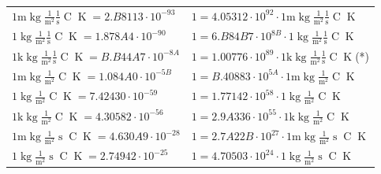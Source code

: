 \begin{center}
\begin{longtable}{l l}
{\color{gray}$1 \bm{\mathrm{ m}}\operatorname{kg}\frac1{\operatorname{m}^2}\frac1{\operatorname{s}}{\operatorname{C}}{\operatorname{K}} = 2.B8113\cdot10^{-93} $}   & {\color{gray}$ 1 = 4.05312\cdot10^{92} \cdot 1 \bm{\mathrm{ m}}\operatorname{kg}\frac1{\operatorname{m}^2}\frac1{\operatorname{s}}{\operatorname{C}}{\operatorname{K}}$}  \\
{\color{black}$1 \bm{\mathrm{ }}\operatorname{kg}\frac1{\operatorname{m}^2}\frac1{\operatorname{s}}{\operatorname{C}}{\operatorname{K}} = 1.878A4\cdot10^{-90} $}   & {\color{black}$ 1 = 6.B84B7\cdot10^{8B} \cdot 1 \bm{\mathrm{ }}\operatorname{kg}\frac1{\operatorname{m}^2}\frac1{\operatorname{s}}{\operatorname{C}}{\operatorname{K}}$}  \\
{\color{gray}$1 \bm{\mathrm{ k}}\operatorname{kg}\frac1{\operatorname{m}^2}\frac1{\operatorname{s}}{\operatorname{C}}{\operatorname{K}} = B.B44A7\cdot10^{-8A} $}   & {\color{gray}$ 1 = 1.00776\cdot10^{89} \cdot 1 \bm{\mathrm{ k}}\operatorname{kg}\frac1{\operatorname{m}^2}\frac1{\operatorname{s}}{\operatorname{C}}{\operatorname{K}}$}\quad(*)\\
{\color{gray}$1 \bm{\mathrm{ m}}\operatorname{kg}\frac1{\operatorname{m}^2}{}{\operatorname{C}}{\operatorname{K}} = 1.084A0\cdot10^{-5B} $}   & {\color{gray}$ 1 = B.40883\cdot10^{5A} \cdot 1 \bm{\mathrm{ m}}\operatorname{kg}\frac1{\operatorname{m}^2}{}{\operatorname{C}}{\operatorname{K}}$}  \\
{\color{black}$1 \bm{\mathrm{ }}\operatorname{kg}\frac1{\operatorname{m}^2}{}{\operatorname{C}}{\operatorname{K}} = 7.42430\cdot10^{-59} $}   & {\color{black}$ 1 = 1.77142\cdot10^{58} \cdot 1 \bm{\mathrm{ }}\operatorname{kg}\frac1{\operatorname{m}^2}{}{\operatorname{C}}{\operatorname{K}}$}  \\
{\color{gray}$1 \bm{\mathrm{ k}}\operatorname{kg}\frac1{\operatorname{m}^2}{}{\operatorname{C}}{\operatorname{K}} = 4.30582\cdot10^{-56} $}   & {\color{gray}$ 1 = 2.9A336\cdot10^{55} \cdot 1 \bm{\mathrm{ k}}\operatorname{kg}\frac1{\operatorname{m}^2}{}{\operatorname{C}}{\operatorname{K}}$}  \\
{\color{gray}$1 \bm{\mathrm{ m}}\operatorname{kg}\frac1{\operatorname{m}^2}{\operatorname{s}}{\operatorname{C}}{\operatorname{K}} = 4.630A9\cdot10^{-28} $}   & {\color{gray}$ 1 = 2.7A22B\cdot10^{27} \cdot 1 \bm{\mathrm{ m}}\operatorname{kg}\frac1{\operatorname{m}^2}{\operatorname{s}}{\operatorname{C}}{\operatorname{K}}$}  \\
{\color{black}$1 \bm{\mathrm{ }}\operatorname{kg}\frac1{\operatorname{m}^2}{\operatorname{s}}{\operatorname{C}}{\operatorname{K}} = 2.74942\cdot10^{-25} $}   & {\color{black}$ 1 = 4.70503\cdot10^{24} \cdot 1 \bm{\mathrm{ }}\operatorname{kg}\frac1{\operatorname{m}^2}{\operatorname{s}}{\operatorname{C}}{\operatorname{K}}$}  \\

\end{longtable}
\end{center}
